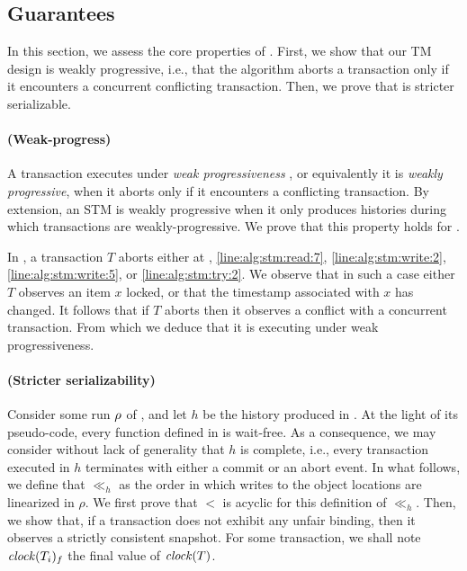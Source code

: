 \subsection{Guarantees}

In this section, we assess the core properties of .
First, we show that our TM design is weakly progressive, i.e., that the algorithm aborts a transaction only if it encounters a concurrent conflicting transaction.
Then, we prove that  is stricter serializable.

\paragraph{(Weak-progress)}
A transaction executes under \emph{weak progressiveness} \cite{Guerraoui:2009}, or equivalently it is \emph{weakly progressive}, when it aborts only if it encounters a conflicting transaction.
By extension, an STM is weakly progressive when it only produces histories during which transactions are weakly-progressive.
We prove that this property holds for .

In , a transaction $T$ aborts either at , \ref{line:alg:stm:read:7}, \ref{line:alg:stm:write:2}, \ref{line:alg:stm:write:5}, or \ref{line:alg:stm:try:2}.
We observe that in such a case either $T$ observes an item $x$ locked, or that the timestamp associated with $x$ has changed.
It follows that if $T$ aborts then it observes a conflict with a concurrent transaction.
From which we deduce that it is executing under weak progressiveness.

\paragraph{(Stricter serializability)}
Consider some run $\run$ of , and let $h$ be the history produced in \run.
At the light of its pseudo-code, every function defined in  is wait-free.
As a consequence, we may consider without lack of generality that $h$ is complete, i.e., every transaction executed in $h$ terminates with either a commit or an abort event.
In what follows, we define that $\ll_h$ as the order in which writes to the object locations are linearized in $\rho$.
We first prove that $<$ is acyclic for this definition of $\ll_h$.
Then, we show that, if a transaction does not exhibit any unfair binding, then it observes a strictly consistent snapshot.
For some transaction, we shall note $\clockOf{T_i}_f$ the final value of $\clockOf{T}$.

